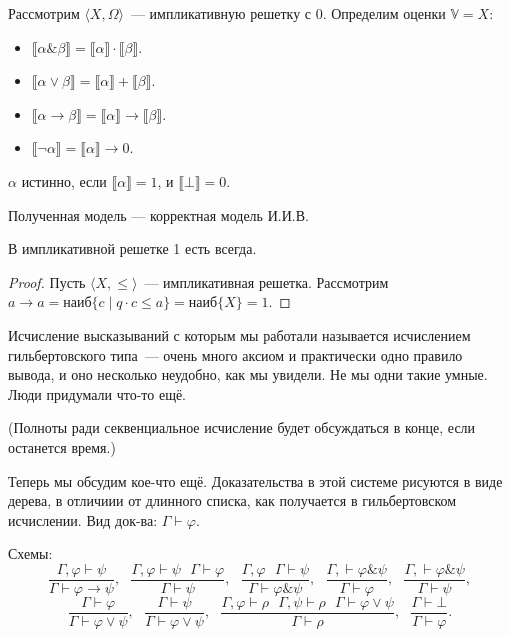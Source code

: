 \begin{theorem}
    Рассмотрим $\langle X, \Omega \rangle$~--- импликативную решетку с $0$. 
    Определим оценки $\mathbb{V}  = X$:
    \begin{itemize}\itemsep=-1mm
        \item     $\llbracket \alpha \& \beta \rrbracket = \llbracket\alpha \rrbracket \cdot \llbracket\beta \rrbracket$.
        \item     $\llbracket \alpha \vee \beta \rrbracket = \llbracket\alpha \rrbracket + \llbracket\beta \rrbracket$.
        \item     $\llbracket \alpha \to \beta \rrbracket = \llbracket\alpha \rrbracket \to \llbracket\beta \rrbracket$.
        \item     $\llbracket \neg \alpha \rrbracket = \llbracket\alpha \rrbracket \to 0$.
    \end{itemize}
    $\alpha$ истинно, если $\llbracket \alpha \rrbracket = 1$, и $\llbracket \bot \rrbracket = 0$.

    Полученная модель --- корректная модель И.И.В.
\end{theorem}

\begin{theorem}
    В импликативной решетке 1 есть всегда.
\end{theorem}
\begin{proof}
    Пусть $\langle X, \leqslant \rangle$~--- импликативная решетка.
    Рассмотрим $a \to a = \text{наиб} \{ c \mid q \cdot c \leqslant a\} = \text{наиб} \{ X \} = 1$.
\end{proof}

Исчисление высказываний с которым мы работали называется исчислением  гильбертовского типа~--- очень много аксиом и практически одно правило вывода, и оно несколько неудобно, как мы увидели.
Не мы одни такие умные. 
Люди придумали что-то ещё.

(Полноты ради секвенциальное исчисление будет обсуждаться в конце, если останется время.)

Теперь мы обсудим кое-что ещё.
Доказательства в этой системе рисуются в виде дерева, в отличиии от длинного списка, как получается в гильбертовском исчислении.
Вид док-ва: $\Gamma \vdash \varphi$.

Схемы:
\[
    \dfrac{\Gamma, \varphi \vdash \psi}{\Gamma \vdash \varphi \to \psi},~~~
    \dfrac{\Gamma, \varphi \vdash \psi~~~ \Gamma \vdash \varphi}{\Gamma \vdash \psi},~~~
    \dfrac{\Gamma, \varphi ~~~ \Gamma \vdash \psi}{\Gamma \vdash \varphi \& \psi},~~~
    \dfrac{\Gamma, \vdash \varphi \& \psi}{\Gamma \vdash \varphi},~~~
    \dfrac{\Gamma, \vdash \varphi \& \psi}{\Gamma \vdash \psi},
\]\[
    \dfrac{\Gamma \vdash \varphi}{\Gamma\vdash\varphi \vee \psi},~~~
    \dfrac{\Gamma \vdash \psi}{\Gamma\vdash\varphi \vee \psi},~~~
    \dfrac{\Gamma, \varphi \vdash \rho~~~ \Gamma, \psi \vdash \rho~~~ \Gamma \vdash \varphi \vee \psi}{\Gamma\vdash\rho},~~~
    \dfrac{\Gamma \vdash \bot }{\Gamma\vdash\varphi}.
\]
\endinput